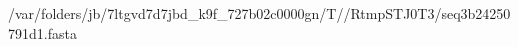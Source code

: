 \documentclass[10pt]{article}
\begin{document}
\begin{texshade}{/var/folders/jb/7ltgvd7d7jbd_k9f_727b02c0000gn/T//RtmpSTJ0T3/seq3b24250791d1.fasta}
\hidelogoscale
{}
\showlegend
\end{texshade}
\end{document}
